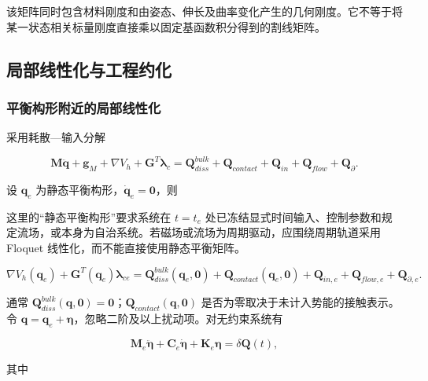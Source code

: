 该矩阵同时包含材料刚度和由姿态、伸长及曲率变化产生的几何刚度。它不等于将某一状态相关标量刚度直接乘以固定基函数积分得到的割线矩阵。

\subsection{局部线性化与工程约化}\label{sec:galerkin-2-10}

\subsubsection{平衡构形附近的局部线性化}\label{sec:galerkin-2-10-1}

采用耗散---输入分解

\begin{equation}
\label{eq:galerkin-2-108}
\mathbf{M}\ddot{\mathbf{q}} + \mathbf{g}_{M} + \nabla V_{h} + \mathbf{G}^{T}\bm{\lambda}_{c} = \mathbf{Q}_{diss}^{bulk} + \mathbf{Q}_{contact} + \mathbf{Q}_{in} + \mathbf{Q}_{flow} + \mathbf{Q}_{\partial}.
\end{equation}

设 \(\mathbf{q}_{e}\) 为静态平衡构形，\({\dot{\mathbf{q}}}_{e} = \mathbf{0}\)，则

这里的``静态平衡构形''要求系统在 \(t = t_{e}\) 处已冻结显式时间输入、控制参数和规定流场，或本身为自治系统。若磁场或流场为周期驱动，应围绕周期轨道采用 Floquet 线性化，而不能直接使用静态平衡矩阵。

\begin{equation}
\label{eq:galerkin-2-109}
\nabla V_{h}\left( \mathbf{q}_{e} \right) + \mathbf{G}^{T}\left( \mathbf{q}_{e} \right)\bm{\lambda}_{ce} = \mathbf{Q}_{diss}^{bulk}\left( \mathbf{q}_{e},\mathbf{0} \right) + \mathbf{Q}_{contact}\left( \mathbf{q}_{e},\mathbf{0} \right) + \mathbf{Q}_{in,e} + \mathbf{Q}_{flow,e} + \mathbf{Q}_{\partial,e}.
\end{equation}

通常 \(\mathbf{Q}_{diss}^{bulk}\left( \mathbf{q},\mathbf{0} \right) = \mathbf{0}\)；\(\mathbf{Q}_{contact}\left( \mathbf{q},\mathbf{0} \right)\) 是否为零取决于未计入势能的接触表示。令 \(\mathbf{q} = \mathbf{q}_{e} + \bm{\eta}\)，忽略二阶及以上扰动项。对无约束系统有

\begin{equation}
\label{eq:galerkin-2-110}
\mathbf{M}_{e}\ddot{\bm{\eta}} + \mathbf{C}_{e}\dot{\bm{\eta}} + \mathbf{K}_{e}\bm{\eta} = \delta\mathbf{Q}(t),
\end{equation}

其中


